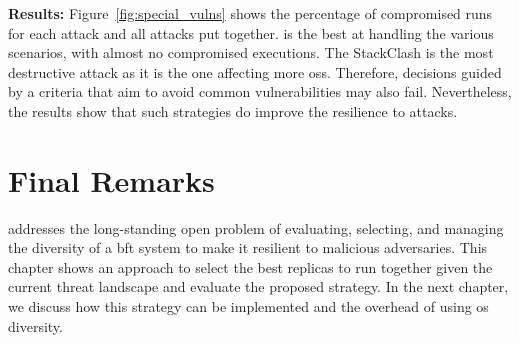 \textbf{Results:}
Figure~\ref{fig:special_vulns} shows the percentage of compromised runs for each attack and all attacks put together.
\system is the best at handling the various scenarios, with almost no compromised executions.
The StackClash is the most destructive attack as it is the one affecting more \glspl{os}.
Therefore, decisions guided by a criteria that aim to avoid common vulnerabilities may also fail. 
Nevertheless, the results show that such strategies do improve the resilience to attacks.




\section{Final Remarks}
\label{sec:finalremarkslazarusdesign}

\system addresses the long-standing open problem of evaluating, selecting, and managing the diversity of a \gls{bft} system to make it resilient to malicious adversaries.
This chapter shows an approach to select the best replicas to run together given the current threat landscape and evaluate the proposed strategy.
In the next chapter, we discuss how this strategy can be implemented and the overhead of using \gls{os} diversity.

